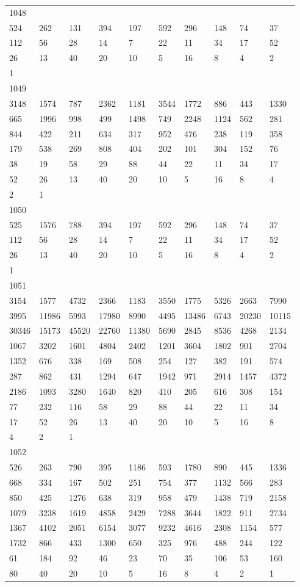 \begin{longtable}{*{10}{l}}
1048&&&&&&&&&\\
524& 262& 131& 394& 197& 592& 296& 148& 74& 37\\
112& 56& 28& 14& 7& 22& 11& 34& 17& 52\\
26& 13& 40& 20& 10& 5& 16& 8& 4& 2\\
1& \\

1049&&&&&&&&&\\
3148& 1574& 787& 2362& 1181& 3544& 1772& 886& 443& 1330\\
665& 1996& 998& 499& 1498& 749& 2248& 1124& 562& 281\\
844& 422& 211& 634& 317& 952& 476& 238& 119& 358\\
179& 538& 269& 808& 404& 202& 101& 304& 152& 76\\
38& 19& 58& 29& 88& 44& 22& 11& 34& 17\\
52& 26& 13& 40& 20& 10& 5& 16& 8& 4\\
2& 1& \\

1050&&&&&&&&&\\
525& 1576& 788& 394& 197& 592& 296& 148& 74& 37\\
112& 56& 28& 14& 7& 22& 11& 34& 17& 52\\
26& 13& 40& 20& 10& 5& 16& 8& 4& 2\\
1& \\

1051&&&&&&&&&\\
3154& 1577& 4732& 2366& 1183& 3550& 1775& 5326& 2663& 7990\\
3995& 11986& 5993& 17980& 8990& 4495& 13486& 6743& 20230& 10115\\
30346& 15173& 45520& 22760& 11380& 5690& 2845& 8536& 4268& 2134\\
1067& 3202& 1601& 4804& 2402& 1201& 3604& 1802& 901& 2704\\
1352& 676& 338& 169& 508& 254& 127& 382& 191& 574\\
287& 862& 431& 1294& 647& 1942& 971& 2914& 1457& 4372\\
2186& 1093& 3280& 1640& 820& 410& 205& 616& 308& 154\\
77& 232& 116& 58& 29& 88& 44& 22& 11& 34\\
17& 52& 26& 13& 40& 20& 10& 5& 16& 8\\
4& 2& 1& \\

1052&&&&&&&&&\\
526& 263& 790& 395& 1186& 593& 1780& 890& 445& 1336\\
668& 334& 167& 502& 251& 754& 377& 1132& 566& 283\\
850& 425& 1276& 638& 319& 958& 479& 1438& 719& 2158\\
1079& 3238& 1619& 4858& 2429& 7288& 3644& 1822& 911& 2734\\
1367& 4102& 2051& 6154& 3077& 9232& 4616& 2308& 1154& 577\\
1732& 866& 433& 1300& 650& 325& 976& 488& 244& 122\\
61& 184& 92& 46& 23& 70& 35& 106& 53& 160\\
80& 40& 20& 10& 5& 16& 8& 4& 2& 1\\


\end{longtable}
